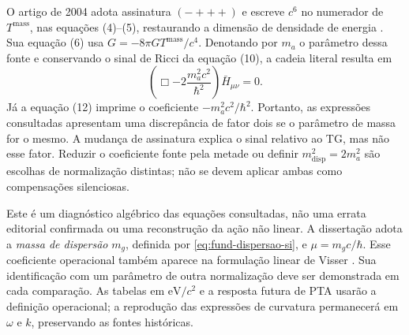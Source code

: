 O artigo de 2004 adota assinatura \((-+++)\) e escreve \(c^6\) no
numerador de \(T^{\mathrm{mass}}\), nas equações (4)--(5), restaurando
a dimensão de densidade de energia \autocite{depaula2004}. Sua equação
(6) usa \(G=-8\pi GT^{\mathrm{mass}}/c^4\). Denotando por
\(m_a\) o parâmetro dessa fonte e conservando o sinal de Ricci da
equação (10), a cadeia literal resulta em
\begin{equation}
 \left(\Box-2\frac{m_a^2c^2}{\hbar^2}\right)\bar H_{\mu\nu}=0.
 \label{eq:fund-artigo-literal}
\end{equation}
Já a equação (12) imprime o coeficiente \(-m_a^2c^2/\hbar^2\).
Portanto, as expressões consultadas apresentam uma discrepância de
fator dois se o parâmetro de massa for o mesmo. A mudança de assinatura
explica o sinal relativo ao TG, mas não esse fator. Reduzir o
coeficiente fonte pela metade ou definir
\(m_{\mathrm{disp}}^2=2m_a^2\) são escolhas de normalização distintas;
não se devem aplicar ambas como compensações silenciosas.

Este é um diagnóstico algébrico das equações consultadas, não uma
errata editorial confirmada ou uma reconstrução da ação não linear.
A dissertação adota a \emph{massa de dispersão} \(m_g\), definida por
\eqref{eq:fund-dispersao-si}, e \(\mu=m_gc/\hbar\).
Esse coeficiente operacional também aparece na formulação linear de
Visser \autocite{visser1998}. Sua identificação com um parâmetro de
outra normalização deve ser demonstrada em cada comparação. As tabelas
em \(\mathrm{eV}/c^2\) e a resposta futura de PTA usarão a definição
operacional; a reprodução das expressões de curvatura permanecerá em
\(\omega\) e \(k\), preservando as fontes históricas.
